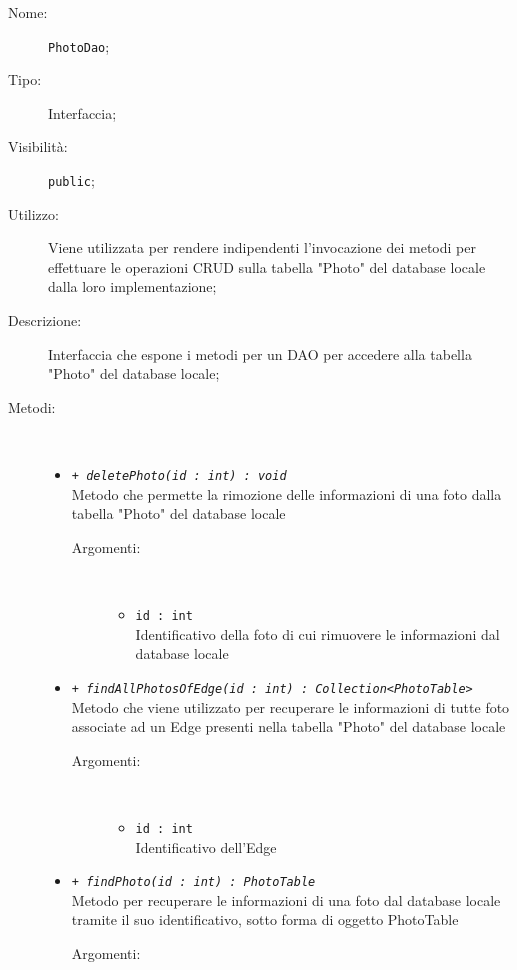 \documentclass[../DefinizioneDiProdotto.tex]{subfiles}
\begin{document}
    \begin{description}
\item[Nome:] \texttt{PhotoDao};
\item[Tipo:] Interfaccia;
\item[Visibilità:] \texttt{public};
\item[Utilizzo:] Viene utilizzata per rendere indipendenti l'invocazione dei metodi per effettuare le operazioni CRUD sulla tabella "Photo" del database locale dalla loro implementazione;
\item[Descrizione:] Interfaccia che espone i metodi per un DAO per accedere alla tabella "Photo" del database locale;
\item[Metodi:] \
\begin{itemize}
\item \texttt{+ \textit{deletePhoto(id : int) : void}}\\
Metodo che permette la rimozione delle informazioni di una foto dalla tabella "Photo" del database locale
 \begin{description}
\item[Argomenti:] \
\begin{itemize}
\item \texttt{id : int}\\
Identificativo della foto di cui rimuovere le informazioni dal database locale\end{itemize}
\end{description}
\item \texttt{+ \textit{findAllPhotosOfEdge(id : int) : Collection<PhotoTable>}}\\
Metodo che viene utilizzato per recuperare le informazioni di tutte foto associate ad un Edge presenti nella tabella "Photo" del database locale
 \begin{description}
\item[Argomenti:] \
\begin{itemize}
\item \texttt{id : int}\\
Identificativo dell'Edge\end{itemize}
\end{description}
\item \texttt{+ \textit{findPhoto(id : int) : PhotoTable}}\\
Metodo per recuperare le informazioni di una foto dal database locale tramite il suo identificativo, sotto forma di oggetto PhotoTable
 \begin{description}
\item[Argomenti:] \

\end{description}
\end{itemize}
\end{description}
\end{document}
